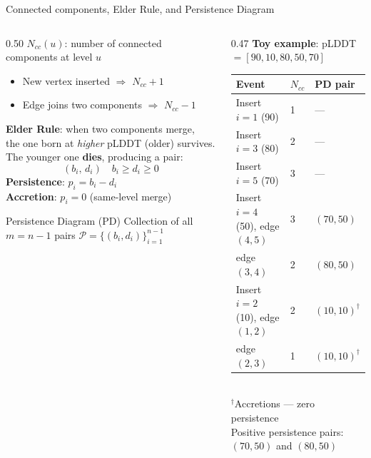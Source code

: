 \documentclass[aspectratio=169, 10pt]{beamer}
\begin{document}
\begin{frame}{Connected components, Elder Rule, and Persistence Diagram}
  \begin{columns}[T]
    \begin{column}{0.50\textwidth}
      \textbf{$N_{cc}(u)$}: number of connected components at level $u$
      \begin{itemize}
        \item New vertex inserted $\Rightarrow$ $N_{cc} +1$
        \item Edge joins two components $\Rightarrow$ $N_{cc} -1$
      \end{itemize}
      \vspace{4pt}
      \textbf{Elder Rule}: when two components merge,\\
      the one born at \emph{higher} pLDDT (older) survives.\\
      The younger one \textbf{dies}, producing a pair:
      \[
        (b_i,\, d_i) \quad b_i \geq d_i \geq 0
      \]
      \textbf{Persistence}: $p_i = b_i - d_i$\\
      \textbf{Accretion}: $p_i = 0$ (same-level merge)
      \vspace{4pt}

      \begin{block}{Persistence Diagram (PD)}
        Collection of all $m = n-1$ pairs
        $\mathcal{P} = \{(b_i, d_i)\}_{i=1}^{n-1}$
      \end{block}
    \end{column}
    \begin{column}{0.47\textwidth}
      \footnotesize
      \textbf{Toy example}: pLDDT $= [90, 10, 80, 50, 70]$\\[4pt]
      \begin{tabular}{@{}lll@{}}
        \toprule
        Event & $N_{cc}$ & PD pair \\
        \midrule
        Insert $i=1$ (90) & 1 & — \\
        Insert $i=3$ (80) & 2 & — \\
        Insert $i=5$ (70) & 3 & — \\
        Insert $i=4$ (50), edge $(4,5)$ & 3 & $(70, 50)$ \\
        edge $(3,4)$      & 2 & $(80, 50)$ \\
        Insert $i=2$ (10), edge $(1,2)$ & 2 & $(10,10)^\dagger$ \\
        edge $(2,3)$      & 1 & $(10,10)^\dagger$ \\
        \bottomrule
      \end{tabular}\\[4pt]
      $^\dagger$Accretions — zero persistence\\[6pt]
      Positive persistence pairs: $(70,50)$ and $(80,50)$
    \end{column}
  \end{columns}
\end{frame}
\end{document}
